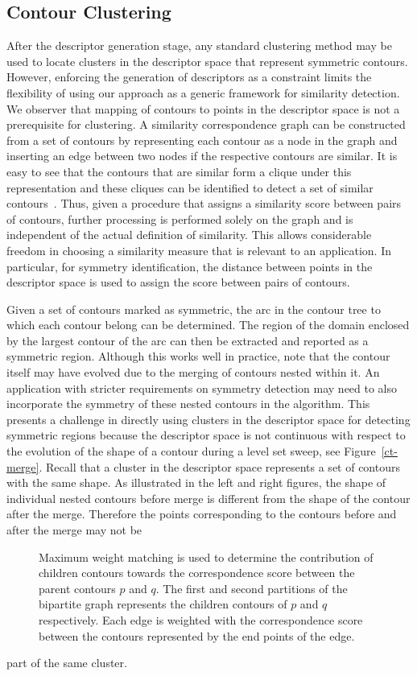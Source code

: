 \documentclass[review,journal]{vgtc}         %
\begin{document}
\subsection{Contour Clustering}\label{clus}
After the descriptor generation stage, any standard clustering method may be used to
locate clusters in the descriptor space that represent symmetric contours. However,
enforcing the generation of descriptors as a constraint limits the flexibility of 
using our approach as a generic framework for similarity detection. We observer that mapping of
contours to points in the
descriptor space is not a prerequisite for clustering. A similarity correspondence
graph can be constructed from a set of contours by representing each contour
as a node in the graph and inserting an edge between two nodes if the respective
contours are similar. It is easy to see that the contours that are similar form
a clique under this representation and these cliques can be identified to detect
a set of similar contours~\cite{Lip10}. Thus, given a procedure that assigns a similarity 
score between pairs of contours, further processing is performed 
solely on the graph and is independent of the actual definition of similarity.
This allows considerable freedom in choosing a similarity measure that is relevant to an application.
In particular, for symmetry identification, the distance between points in the descriptor space is
used to assign the score between pairs of contours. 

Given a set of contours marked as symmetric, the arc in the contour tree 
to which each contour belong can be determined. The region of the domain
enclosed by the largest contour of the arc can then be extracted and reported
as a symmetric region. Although this works well in practice, note that the contour
itself may have evolved due to the merging of contours nested within it.
An application with stricter requirements on symmetry detection may need to
also incorporate the symmetry of these nested contours in the algorithm. 
This presents a challenge in directly using clusters in the descriptor space 
for detecting symmetric regions because the descriptor space is not continuous with 
respect to the evolution of the shape of a contour during a level set sweep, 
see Figure~\ref{ct-merge}. Recall that a cluster in the descriptor space represents a
set of contours with the same shape. As illustrated in the left and right
figures, the shape of individual nested contours
before merge is different from the shape of the contour after the merge.
Therefore the points corresponding to the contours before and after the merge may not be
\begin{figure}[h]
\centering
\caption{\label{bip}Maximum weight matching is used to determine the contribution of children
	contours towards the correspondence score between the parent contours $p$ and $q$. The
	first and second partitions of the bipartite graph represents the children contours of $p$
	and $q$ respectively. Each edge is weighted with the correspondence score between the
	contours represented by the end points of the edge.}
\end{figure}
part of the same cluster. 
\end{document}
